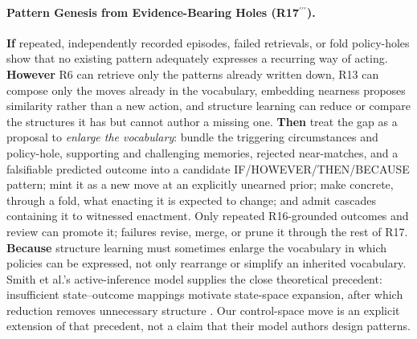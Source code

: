 \hypertarget{pat-r17mint}{}\paragraph{Pattern Genesis from Evidence-Bearing Holes (R17\hspace{.1em}$^{\prime\prime\prime}$).}\label{pat:r17mint} \textbf{If} repeated, independently recorded episodes, failed retrievals, or fold policy-holes show that no existing pattern adequately expresses a recurring way of acting. \textbf{However} R6 can retrieve only the patterns already written down, R13 can compose only the moves already in the vocabulary, embedding nearness proposes similarity rather than a new action, and structure learning can reduce or compare the structures it has but cannot author a missing one. \textbf{Then} treat the gap as a proposal to \emph{enlarge the vocabulary}: bundle the triggering circumstances and policy-hole, supporting and challenging memories, rejected near-matches, and a falsifiable predicted outcome into a candidate IF/HOWEVER/THEN/BECAUSE pattern; mint it as a new move at an explicitly unearned prior; make concrete, through a fold, what enacting it is expected to change; and admit cascades containing it to witnessed enactment.  Only repeated R16-grounded outcomes and review can promote it; failures revise, merge, or prune it through the rest of R17. \textbf{Because} structure learning must sometimes enlarge the vocabulary in which policies can be expressed, not only rearrange or simplify an inherited vocabulary. Smith et al.'s active-inference model supplies the close theoretical precedent: insufficient state--outcome mappings motivate state-space expansion, after which reduction removes unnecessary structure \cite{smith2020structure}. Our control-space move is an explicit extension of that precedent, not a claim that their model authors design patterns.

